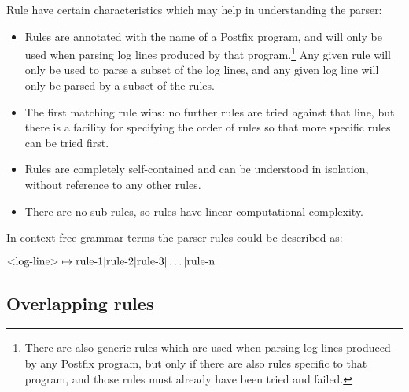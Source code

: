 \documentclass[a4paper,12pt,draft]{article}
\begin{document}
Rule have certain characteristics which may help in understanding the
parser:

\begin{itemize}

    \item Rules are annotated with the name of a Postfix program, and will
        only be used when parsing log lines produced by that
        program.\footnote{There are also generic rules which are used when
        parsing log lines produced by any Postfix program, but only if
        there are also rules specific to that program, and those rules must
        already have been tried and failed.}  Any given rule will only be
        used to parse a subset of the log lines, and any given log line
        will only be parsed by a subset of the rules.

    \item The first matching rule wins: no further rules are tried against
        that line, but there is a facility for specifying the order of
        rules so that more specific rules can be tried first.

    \item Rules are completely self-contained and can be understood in
        isolation, without reference to any other rules.

    \item There are no sub-rules, so rules have linear computational
        complexity.

\end{itemize}

\label{comparison against context-free grammars}

In context-free grammar terms the parser rules could be described as:

$\text{\textless{}log-line\textgreater{}} \mapsto \text{rule-1} |
\text{rule-2} | \text{rule-3} | \dots | \text{rule-n}$


\subsection{Overlapping rules}

\label{overlapping rules}
\end{document}
